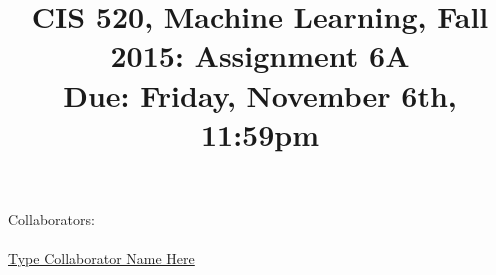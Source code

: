 \documentclass[english]{article}
\title{CIS 520, Machine Learning, Fall 2015: Assignment 6A \\
Due: Friday, November 6th, 11:59pm \\
\points{54} }
\date{}
\begin{document}
\maketitle
{\normalsize Collaborators: \\ 
\\ \underline{ Type Collaborator Name Here        }}


\end{document}
